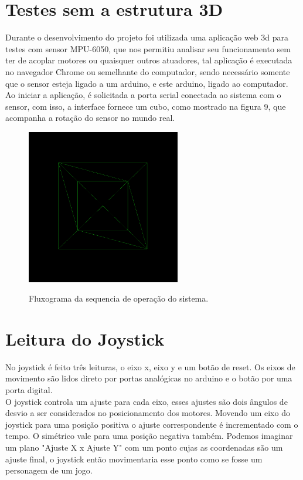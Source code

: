 \section{Testes sem a estrutura 3D}

Durante o desenvolvimento do projeto foi utilizada uma aplicação web 3d para testes com sensor MPU-6050, que nos permitiu analisar seu funcionamento sem ter de acoplar motores ou quaisquer outros atuadores, tal aplicação é executada no navegador Chrome ou semelhante do computador, sendo necessário somente que o sensor esteja ligado a um arduino, e este arduino, ligado ao computador. Ao iniciar a aplicação, é solicitada a porta serial conectada ao sistema com o sensor, com isso, a interface fornece um cubo, como mostrado na figura 9, que acompanha a rotação do sensor no mundo real.

\begin{figure}[H]
\centering
\includegraphics[width=0.6\textwidth]{Capitulo3 - Software/3dcubo.png}\\
\caption{\label{fig:widgets}Fluxograma da sequencia de operação do sistema.}
\end{figure}

\section{Leitura do Joystick}
No joystick é feito três leituras, o eixo x, eixo y e um botão de reset. Os eixos de movimento são lidos direto por portas analógicas no arduino e o botão por uma porta digital.\\
\indent O joystick controla um ajuste para cada eixo, esses ajustes são dois ângulos de desvio a ser considerados no posicionamento dos motores. Movendo um eixo do joystick para uma posição positiva o ajuste correspondente é incrementado com o tempo. O simétrico vale para uma posição negativa também. Podemos imaginar um plano "Ajuste X x Ajuste Y" com um ponto cujas as coordenadas são um ajuste final, o joystick então movimentaria esse ponto como se fosse um personagem de um jogo.

